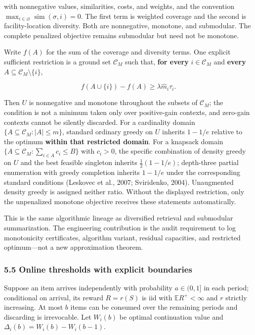 \documentclass[
  11pt]{article}
\begin{document}
with nonnegative values, similarities, costs, and weights, and the
convention \(\max_{i\in\varnothing}\operatorname{sim}(\sigma,i)=0\). The
first term is weighted coverage and the second is facility-location
diversity. Both are nonnegative, monotone, and submodular. The complete
penalized objective remains submodular but need not be monotone.

Write \(f(A)\) for the sum of the coverage and diversity terms. One
explicit sufficient restriction is a ground set \(\mathcal C_M\) such
that, \textbf{for every} \(i\in\mathcal C_M\) and \textbf{every}
\(A\subseteq\mathcal C_M\setminus\{i\}\),

\[f(A\cup\{i\})-f(A)\ge\lambda\hat m_i\tau_i.\]

Then \(U\) is nonnegative and monotone throughout the subsets of
\(\mathcal C_M\); the condition is not a minimum taken only over
positive-gain contexts, and zero-gain contexts cannot be silently
discarded. For a cardinality domain
\(\{A\subseteq\mathcal C_M:|A|\le m\}\), standard ordinary greedy on
\(U\) inherits \(1-1/e\) relative to the optimum \textbf{within that
restricted domain}. For a knapsack domain
\(\{A\subseteq\mathcal C_M:\sum_{i\in A}c_i\le B\}\) with \(c_i>0\), the
specific combination of density greedy on \(U\) and the best feasible
singleton inherits \(\tfrac12(1-1/e)\); depth-three partial enumeration
with greedy completion inherits \(1-1/e\) under the corresponding
standard conditions (Leskovec et al., 2007; Sviridenko, 2004).
Unaugmented density greedy is assigned neither ratio. Without the
displayed restriction, only the unpenalized monotone objective receives
these statements automatically.

This is the same algorithmic lineage as diversified retrieval and
submodular summarization. The engineering contribution is the audit
requirement to log monotonicity certificates, algorithm variant,
residual capacities, and restricted optimum---not a new approximation
theorem.

\subsubsection{5.5 Online thresholds with explicit
boundaries}\label{online-thresholds-with-explicit-boundaries}

Suppose an item arrives independently with probability \(a\in(0,1]\) in
each period; conditional on arrival, its reward \(R=r(S)\) is iid with
\(\mathbb E R^+<\infty\) and \(r\) strictly increasing. At most \(b\)
items can be consumed over the remaining periods and discarding is
irrevocable. Let \(W_i(b)\) be optimal continuation value and
\(\Delta_i(b)=W_i(b)-W_i(b-1)\).
\end{document}
